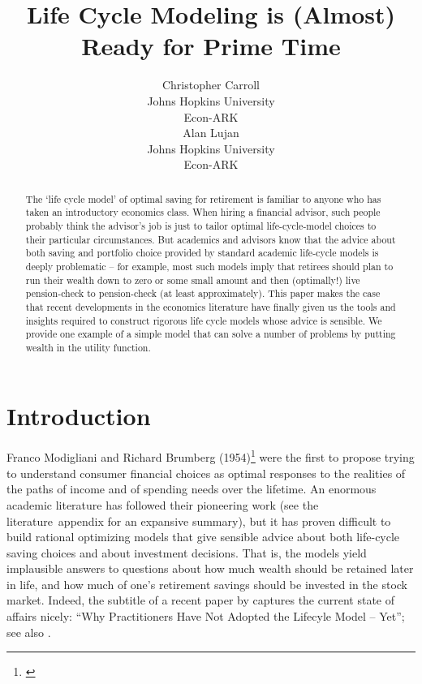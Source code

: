 \documentclass{article}
\title{Life Cycle Modeling is (Almost) \\ Ready for Prime Time}
\date{\displaydate{articleDate}}
\author{Christopher Carroll\footnotemark[1]\\
Johns Hopkins University\\Econ-ARK\\\AND
Alan Lujan\\
Johns Hopkins University\\Econ-ARK\\}
\begin{document}
\maketitle
{}

\begin{abstract}
The `life cycle model' of optimal saving for retirement is familiar to anyone who has taken an introductory economics class.
When hiring a financial advisor, such people probably think the advisor's job is just to tailor optimal life-cycle-model choices to their particular circumstances.
But academics and advisors know that the advice about both saving and portfolio choice provided by standard academic life-cycle models is deeply problematic -- for example, most such models imply that retirees should plan to run their wealth down to zero or some small amount and then (optimally!) live pension-check to pension-check (at least approximately).
This paper makes the case that recent developments in the economics literature have finally given us the tools and insights required to construct rigorous life cycle models whose advice is sensible.
We provide one example of a simple model that can solve a number of problems by putting wealth in the utility function.
\end{abstract}

\keywords{}


\section{Introduction}

Franco Modigliani and Richard Brumberg (1954)\footnote{\cite{2005}} were the first to propose trying to understand consumer financial choices as optimal responses to the realities of the paths of income and of spending needs over the lifetime.
An enormous academic literature has followed their pioneering work (see the literature~appendix for an expansive summary),
but it has proven difficult to build rational optimizing models that give sensible advice about both life-cycle saving choices and about investment decisions.
That is, the models yield implausible answers to questions about how much wealth should be retained later in life, and how much of one's retirement savings should be invested in the stock market.
Indeed, the subtitle of a recent paper by \cite{Daga_2023} captures the current state of affairs nicely: ``Why Practitioners Have Not Adopted the Lifecyle Model -- Yet''; see also \cite{DeNardi2016d}.
\end{document}

